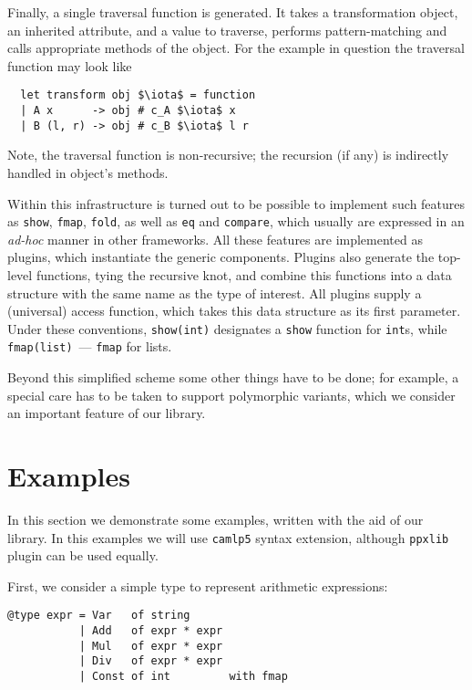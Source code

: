 \documentclass[submission,copyright,creativecommons]{eptcs}
\newcommand{\cd}[1]{\texttt{#1}}
\begin{document}
Finally, a single traversal function is generated. It takes a transformation object, an inherited attribute, and a value to traverse, performs pattern-matching
and calls appropriate methods of the object. For the example in question the traversal function may look like

\begin{lstlisting}
  let transform obj $\iota$ = function
  | A x      -> obj # c_A $\iota$ x
  | B (l, r) -> obj # c_B $\iota$ l r
\end{lstlisting}

Note, the traversal function is non-recursive; the recursion (if any) is indirectly handled in object's methods.

Within this infrastructure is turned out to be possible to implement such features as \cd{show}, \cd{fmap}, \cd{fold},
as well as \cd{eq} and \cd{compare}, which usually are expressed in an \emph{ad-hoc} manner in other frameworks. All these features are
implemented as plugins, which instantiate the generic components. Plugins also generate the top-level functions, tying the recursive knot,
and combine this functions into a data structure with the same name as the type of interest. All plugins supply a (universal) access function,
which takes this data structure as its first parameter. Under these conventions, \cd{show(int)} designates a \cd{show} function for \cd{int}s,
while \cd{fmap(list)}~--- \cd{fmap} for lists.

Beyond this simplified scheme some other things have to be done; for example, a special care has to be taken to support polymorphic variants, which
we consider an important feature of our library.

\section{Examples}

In this section we demonstrate some examples, written with the aid of our library. In this examples we will use \cd{camlp5} syntax extension,
although \cd{ppxlib} plugin can be used equally.

First, we consider a simple type to represent arithmetic expressions:

\begin{lstlisting}
@type expr = Var   of string
           | Add   of expr * expr
           | Mul   of expr * expr
           | Div   of expr * expr
           | Const of int         with fmap
\end{lstlisting}
\end{document}
